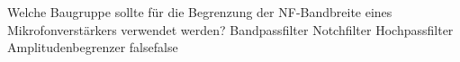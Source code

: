     {Welche Baugruppe sollte für die Begrenzung der NF-Bandbreite eines Mikrofonverstärkers verwendet werden?}
    {Bandpassfilter}
    {Notchfilter}
    {Hochpassfilter}
    {Amplitudenbegrenzer}
    {false}{false}